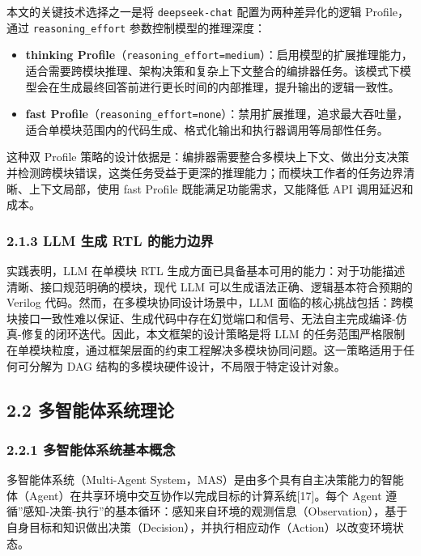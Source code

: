 本文的关键技术选择之一是将 \texttt{deepseek-chat} 配置为两种差异化的逻辑
Profile，通过 \texttt{reasoning\_effort} 参数控制模型的推理深度：

\begin{itemize}
\tightlist
\item
  \textbf{thinking
  Profile}（\texttt{reasoning\_effort=\textquotesingle{}medium\textquotesingle{}}）：启用模型的扩展推理能力，适合需要跨模块推理、架构决策和复杂上下文整合的编排器任务。该模式下模型会在生成最终回答前进行更长时间的内部推理，提升输出的逻辑一致性。
\item
  \textbf{fast
  Profile}（\texttt{reasoning\_effort=\textquotesingle{}none\textquotesingle{}}）：禁用扩展推理，追求最大吞吐量，适合单模块范围内的代码生成、格式化输出和执行器调用等局部性任务。
\end{itemize}

这种双 Profile
策略的设计依据是：编排器需要整合多模块上下文、做出分支决策并检测跨模块错误，这类任务受益于更深的推理能力；而模块工作者的任务边界清晰、上下文局部，使用
fast Profile 既能满足功能需求，又能降低 API 调用延迟和成本。

\subsubsection{2.1.3 LLM 生成 RTL
的能力边界}\label{llm-ux751fux6210-rtl-ux7684ux80fdux529bux8fb9ux754c}

实践表明，LLM 在单模块 RTL
生成方面已具备基本可用的能力：对于功能描述清晰、接口规范明确的模块，现代
LLM 可以生成语法正确、逻辑基本符合预期的 Verilog
代码。然而，在多模块协同设计场景中，LLM
面临的核心挑战包括：跨模块接口一致性难以保证、生成代码中存在幻觉端口和信号、无法自主完成编译-仿真-修复的闭环迭代。因此，本文框架的设计策略是将
LLM
的任务范围严格限制在单模块粒度，通过框架层面的约束工程解决多模块协同问题。这一策略适用于任何可分解为
DAG 结构的多模块硬件设计，不局限于特定设计对象。

\subsection{2.2
多智能体系统理论}\label{ux591aux667aux80fdux4f53ux7cfbux7edfux7406ux8bba}

\subsubsection{2.2.1
多智能体系统基本概念}\label{ux591aux667aux80fdux4f53ux7cfbux7edfux57faux672cux6982ux5ff5}

多智能体系统（Multi-Agent
System，MAS）是由多个具有自主决策能力的智能体（Agent）在共享环境中交互协作以完成目标的计算系统{[}17{]}。每个
Agent
遵循''感知-决策-执行''的基本循环：感知来自环境的观测信息（Observation），基于自身目标和知识做出决策（Decision），并执行相应动作（Action）以改变环境状态。

